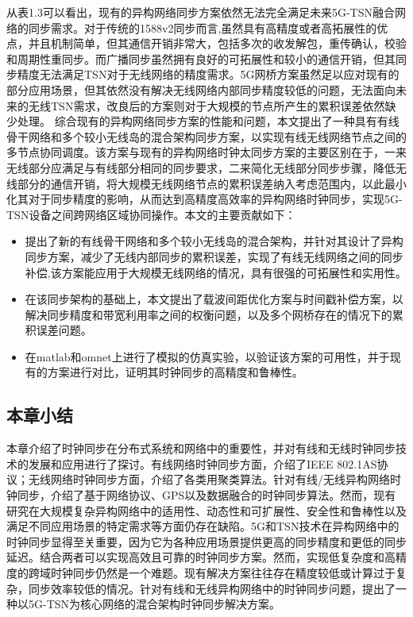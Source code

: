 \documentclass[UTF8,a4paper,12pt]{ctexart}
\numberwithin{equation}{section}
\begin{document}
从表1.3可以看出，现有的异构网络同步方案依然无法完全满足未来5G-TSN融合网络的同步需求。对于传统的1588v2同步而言,虽然具有高精度或者高拓展性的优点，并且机制简单，但其通信开销非常大，包括多次的收发解包，重传确认，校验和周期性重同步。而广播同步虽然拥有良好的可拓展性和较小的通信开销，但其同步精度无法满足TSN对于无线网络的精度需求。5G网桥方案虽然足以应对现有的部分应用场景，但其依然没有解决无线网络内部同步精度较低的问题，无法面向未来的无线TSN需求，改良后的方案则对于大规模的节点所产生的累积误差依然缺少处理。
综合现有的异构网络同步方案的性能和问题，本文提出了一种具有有线骨干网络和多个较小无线岛的混合架构同步方案，以实现有线无线网络节点之间的多节点协同调度。该方案与现有的异构网络时钟太同步方案的主要区别在于，一来无线部分应满足与有线部分相同的同步要求，二来简化无线部分同步步骤，降低无线部分的通信开销，将大规模无线网络节点的累积误差纳入考虑范围内，以此最小化其对于同步精度的影响，从而达到高精度高效率的异构网络时钟同步，实现5G-TSN设备之间跨网络区域协同操作。本文的主要贡献如下：
\begin{itemize}
	\item 提出了新的有线骨干网络和多个较小无线岛的混合架构，并针对其设计了异构同步方案，减少了无线内部同步的累积误差，实现了有线无线网络之间的同步补偿,该方案能应用于大规模无线网络的情况，具有很强的可拓展性和实用性。
	\item 在该同步架构的基础上，本文提出了载波间距优化方案与时间戳补偿方案，以解决同步精度和带宽利用率之间的权衡问题，以及多个网桥存在的情况下的累积误差问题。
	\item 在matlab和omnet上进行了模拟的仿真实验，以验证该方案的可用性，并于现有的方案进行对比，证明其时钟同步的高精度和鲁棒性。
\end{itemize}

\subsection{本章小结}
本章介绍了时钟同步在分布式系统和网络中的重要性，并对有线和无线时钟同步技术的发展和应用进行了探讨。有线网络时钟同步方面，介绍了IEEE 802.1AS协议；无线网络时钟同步方面，介绍了各类用聚类算法。针对有线/无线异构网络时钟同步，介绍了基于网络协议、GPS以及数据融合的时钟同步算法。然而，现有研究在大规模复杂异构网络中的适用性、动态性和可扩展性、安全性和鲁棒性以及满足不同应用场景的特定需求等方面仍存在缺陷。5G和TSN技术在异构网络中的时钟同步显得至关重要，因为它为各种应用场景提供更高的同步精度和更低的同步延迟。结合两者可以实现高效且可靠的时钟同步方案。然而，实现低复杂度和高精度的跨域时钟同步仍然是一个难题。现有解决方案往往存在精度较低或计算过于复杂，同步效率较低的情况。针对有线和无线异构网络中的时钟同步问题，提出了一种以5G-TSN为核心网络的混合架构时钟同步解决方案。
\end{document}
